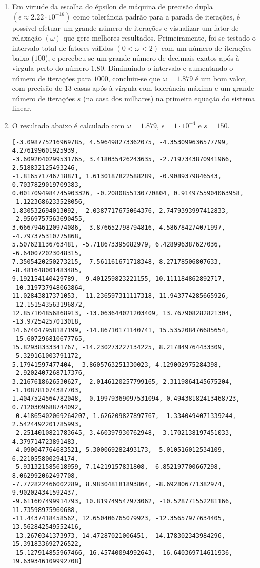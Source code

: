 \documentclass{article}
\newenvironment{arabenum}{
    \begin{enumerate}[label=\textbf{\arabic*})]
}{
    \end{enumerate}
}
\newenvironment{alphenum}{
    \begin{enumerate}[label=(\alph*)]
}{
    \end{enumerate}
}
\begin{document}
\begin{arabenum}
\begin{alphenum}
\item Em virtude da escolha do épsilon de máquina de precisão dupla
$(\epsilon \approx 2.22 \cdot 10^{-16})$ como tolerância padrão para a parada
de iterações, é possível efetuar um grande número de iterações e visualizar um
fator de relaxação $(\omega)$ que gere melhores resultados. Primeiramente,
foi-se testado o intervalo total de fatores válidos $(0 < \omega < 2)$ com um
número de iterações baixo ($100$), e percebeu-se um grande número de decimais
exatos após à virgula perto do número $\boldsymbol{1.80}$. Diminuindo o
intervalo e aumentando o número de iterações para $1000$, concluiu-se que
$\omega = \boldsymbol{1.879}$ é um bom valor, com precisão de 13 casas após à
vírgula com tolerância máxima e um grande número de iterações $s$ (na casa dos
milhares) na primeira equação do sistema linear.

\item O resultado abaixo é calculado com $\omega = 1.879$,
$\epsilon = 1 \cdot 10^{-4}$ e $s = 150$.

\begin{verbatim}
[-3.098775216969785, 4.596498273362075, -4.353099636577799, 4.276199601925939,
-3.6092040299531765, 3.418035426243635, -2.7197343870941966, 2.518832125493246,
-1.816571746718871, 1.6130187822588289, -0.9089379846543, 0.7037829019709383,
0.0017094984745903326, -0.2080855130770804, 0.9149755904063958, -1.1223686233528056,
1.830532694013092, -2.0387717675064376, 2.7479393997412833, -2.9569757563690455,
3.6667946120974086, -3.876652798794816, 4.586784274071997, -4.797375310775868,
5.507621136763481, -5.718673395082979, 6.428996387627036, -6.640072023048315,
7.3505420250273215, -7.561161671718348, 8.27178506807633, -8.481648001483485,
9.192154140429789, -9.401259823221155, 10.111184862892717, -10.319737948063864,
11.02843817371053, -11.236597311117318, 11.943774285665926, -12.151543563196872,
12.857104856868913, -13.063644021203409, 13.767908282821304, -13.97254257013018,
14.674047958187199, -14.86710171140741, 15.535208476685654, -15.607296810677765,
15.82938333341767, -14.230273227134225, 8.217849764433309, -5.329161003791172,
5.17941597477404, -3.8605763251330023, 4.129002975284398, -2.9202407268717376,
3.2167618626530627, -2.0146120257799165, 2.3119864145675204, -1.108781074387703,
1.4047524564782048, -0.19979369097531094, 0.49438182413468723, 0.7120309688744092,
-0.41865402069264207, 1.626209827897767, -1.3340494071339244, 2.5424492201785993,
-2.2514010821783645, 3.460397930762948, -3.1702138197451033, 4.379714723891483,
-4.090047764683521, 5.300069282493173, -5.010516012534109, 6.221055800294174,
-5.931321585618959, 7.14219157831808, -6.852197700667298, 8.062992062497708,
-7.772822466002289, 8.983048181893864, -8.692806771382974, 9.902024341592437,
-9.611607499914793, 10.819749547973062, -10.528771552281166, 11.73598975960688,
-11.4437418458562, 12.650406765079923, -12.35657977634405, 13.562842549552416,
-13.2670341373973, 14.47287021006451, -14.178302343984296, 15.391833692726522,
-15.127914855967466, 16.45740094992643, -16.640369714611936, 19.639346109992708]
\end{verbatim}


\end{alphenum}
\end{arabenum}
\end{document}
